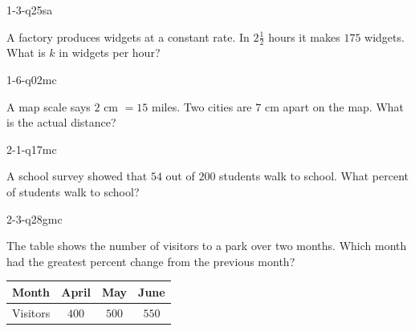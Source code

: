 
\begin{practiceQuestion}{1-3-q25}{sa}
\begin{questionText}
A factory produces widgets at a constant rate. In $2\frac{1}{2}$ hours it makes $175$ widgets. What is $k$ in widgets per hour?
\end{questionText}
\end{practiceQuestion}

\begin{practiceQuestion}{1-6-q02}{mc}
\begin{questionText}
A map scale says $2$ cm $= 15$ miles. Two cities are $7$ cm apart on the map. What is the actual distance?
\end{questionText}
\end{practiceQuestion}

\begin{practiceQuestion}{2-1-q17}{mc}
\begin{questionText}
A school survey showed that $54$ out of $200$ students walk to school. What percent of students walk to school?
\end{questionText}
\end{practiceQuestion}

\begin{practiceQuestion}{2-3-q28}{gmc}
\begin{questionText}
The table shows the number of visitors to a park over two months. Which month had the greatest percent change from the previous month?

\begin{center}
\begin{tabular}{|l|c|c|c|}
\hline
\textbf{Month} & \textbf{April} & \textbf{May} & \textbf{June} \\
\hline
Visitors & $400$ & $500$ & $550$ \\
\hline
\end{tabular}
\end{center}
\end{questionText}
\end{practiceQuestion}


